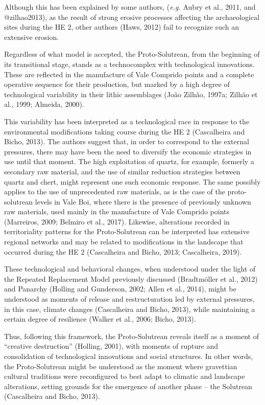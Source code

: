 \documentclass[12pt,twoside]{reedthesis}
\begin{document}
Although this has been explained by some authors, (\emph{e.g.} Aubry et al., 2011, and @zilhao2013), as the result of strong erosive processes affecting the archaeological sites during the HE 2, other authors (Haws, 2012) fail to recognize such an extensive erosion.

Regardless of what model is accepted, the Proto-Solutrean, from the beginning of its transitional stage, stands as a technocomplex with technological innovations. These are reflected in the manufacture of Vale Comprido points and a complete operative sequence for their production, but marked by a high degree of technological variability in their lithic assemblages (João Zilhão, 1997a; Zilhão et al., 1999; Almeida, 2000).

This variability has been interpreted as a technological race in response to the environmental modifications taking course during the HE 2 (Cascalheira and Bicho, 2013). The authors suggest that, in order to correspond to the external pressures, there may have been the need to diversify the economic strategies in use until that moment. The high exploitation of quartz, for example, formerly a secondary raw material, and the use of similar reduction strategies between quartz and chert, might represent one such economic response. The same possibly applies to the use of unprecedented raw materials, as is the case of the proto-solutrean levels in Vale Boi, where there is the presence of previously unknown raw materials, used mainly in the manufacture of Vale Comprido points (Marreiros, 2009; Belmiro et al., 2017). Likewise, alterations recorded in territoriality patterns for the Proto-Solutrean can be interpreted has extensive regional networks and may be related to modifications in the landscape that occurred during the HE 2 (Cascalheira and Bicho, 2013; Cascalheira, 2019).

These technological and behavioral changes, when understood under the light of the Repeated Replacement Model previously discussed (Bradtmöller et al., 2012) and Panarchy (Holling and Gunderson, 2002; Allen et al., 2014), might be understood as moments of release and restructuration led by external pressures, in this case, climate changes (Cascalheira and Bicho, 2013), while maintaining a certain degree of resilience (Walker et al., 2006; Bicho, 2013).

Thus, following this framework, the Proto-Solutrean reveals itself as a moment of ``creative destruction'' (Holling, 2001), with moments of rupture and consolidation of technological innovations and social structures. In other words, the Proto-Solutrean might be understood as the moment where gravettian cultural traditions were reconfigured to best adapt to climatic and landscape alterations, setting grounds for the emergence of another phase -- the Solutrean (Cascalheira and Bicho, 2013).
\end{document}
